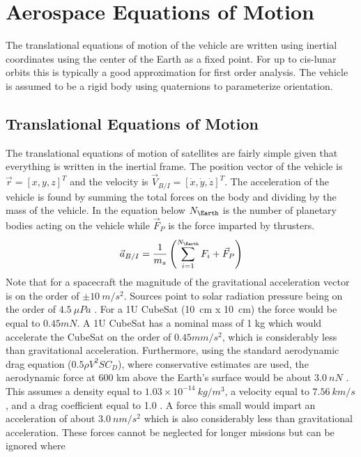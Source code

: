 \documentclass{article}
\begin{document}
\section{Aerospace Equations of Motion}

The translational equations of motion of
the vehicle are written using inertial coordinates using the center
of the Earth as a fixed point. For up to cis-lunar orbits this is typically
a good approximation for first order analysis. The vehicle is
assumed to be a rigid body using quaternions to parameterize
orientation. 

\subsection{Translational Equations of Motion}

The translational equations of motion of satellites are fairly simple given
that everything is written in the inertial frame. The position vector
of the vehicle is $\vec{r} = [x,y,z]^T$ and the velocity is
$\vec{V}_{B/I}=[\dot{x},\dot{y},\dot{z}]^T$. The acceleration of
the vehicle is found by summing the total forces on the body
and dividing by the mass of the vehicle. In the equation below
$N_\Earth$ is the number of planetary bodies acting on the vehicle
while $\vec{F}_P$ is the force imparted by thrusters. 
\begin{equation}
  \vec{a}_{B/I} = \frac{1}{m_s}\left(\sum\limits_{i=1}^{N_\Earth}F_i + \vec{F}_P \right)
\end{equation}
Note that for a spacecraft the magnitude of the gravitational
acceleration vector is on the order of $\pm 10~m/s^2$. Sources point
to solar radiation pressure being on the order of $4.5~\mu Pa$
\cite{Radiation}. For a 1U CubeSat (10~cm x 10~cm) 
the force would be equal to $0.45 mN$. A 1U CubeSat has a nominal
mass of 1 kg which would accelerate the CubeSat on the order of
$0.45 mm/s^2$, which is considerably less than gravitational
acceleration. Furthermore, using the standard aerodynamic drag
equation ($0.5\rho V^2 S C_D$), where conservative estimates are used,
the aerodynamic force at 600 km above the Earth's surface would be
about $3.0~nN$ \cite{AndersonD}. This assumes a density equal to $1.03
\times 10^{-14}~kg/m^3$, a velocity equal to $7.56~km/s$,
and a drag coefficient equal to 1.0 \cite{Density_Model}. A force this
small would impart an acceleration of about $3.0~nm/s^2$ which is also
considerably less than gravitational acceleration. These forces cannot be
neglected for longer missions but can be ignored where
\end{document}
